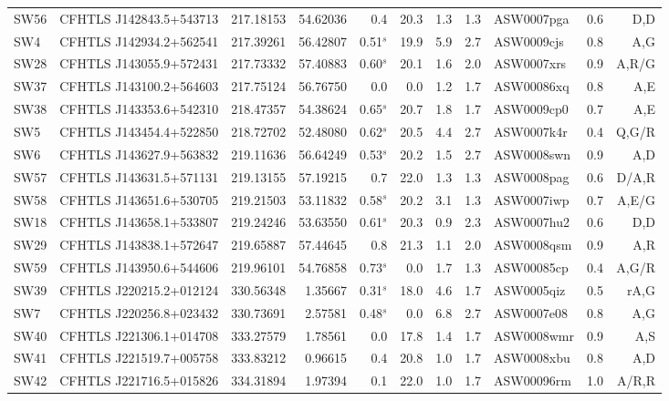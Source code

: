 \documentclass[useAMS,usenatbib,a4paper]{mn2e}
\begin{document}
\begin{center}
\begin{longtable}{llrrrrrrlrr}
SW56 & CFHTLS J142843.5+543713 & 217.18153 &  54.62036 &  0.4 & 20.3 &  1.3 &  1.3 & ASW0007pga &  0.6 &  D,D   \\
SW4 & CFHTLS J142934.2+562541 & 217.39261 &  56.42807 &  0.51$^s$ & 19.9 &  5.9 &  2.7 & ASW0009cjs &  0.8 &  A,G   \\
SW28 & CFHTLS J143055.9+572431 & 217.73332 &  57.40883 &  0.60$^s$ & 20.1 &  1.6 &  2.0 & ASW0007xrs &  0.9 &  A,R/G   \\
SW37 & CFHTLS J143100.2+564603 & 217.75124 &  56.76750 &  0.0 &  0.0 &  1.2 &  1.7 & ASW00086xq &  0.8 &  A,E   \\
SW38 & CFHTLS J143353.6+542310 & 218.47357 &  54.38624 &  0.65$^s$ & 20.7 &  1.8 &  1.7 & ASW0009cp0 &  0.7 &  A,E   \\
SW5 & CFHTLS J143454.4+522850 & 218.72702 &  52.48080 &  0.62$^s$ & 20.5 &  4.4 &  2.7 & ASW0007k4r &  0.4 &  Q,G/R   \\
SW6 & CFHTLS J143627.9+563832 & 219.11636 &  56.64249 &  0.53$^s$ & 20.2 &  1.5 &  2.7 & ASW0008swn &  0.9 &  A,D   \\
SW57 & CFHTLS J143631.5+571131 & 219.13155 &  57.19215 &  0.7 & 22.0 &  1.3 &  1.3 & ASW0008pag &  0.6 &  D/A,R   \\
SW58 & CFHTLS J143651.6+530705 & 219.21503 &  53.11832 &  0.58$^s$ & 20.2 &  3.1 &  1.3 & ASW0007iwp &  0.7 &  A,E/G   \\
SW18 & CFHTLS J143658.1+533807 & 219.24246 &  53.63550 &  0.61$^s$ & 20.3 &  0.9 &  2.3 & ASW0007hu2 &  0.6 &  D,D   \\
SW29 & CFHTLS J143838.1+572647 & 219.65887 &  57.44645 &  0.8 & 21.3 &  1.1 &  2.0 & ASW0008qsm &  0.9 &  A,R   \\
SW59 & CFHTLS J143950.6+544606 & 219.96101 &  54.76858 &  0.73$^s$ &  0.0 &  1.7 &  1.3 & ASW00085cp &  0.4 &  A,G/R   \\
SW39 & CFHTLS J220215.2+012124 & 330.56348 &   1.35667 &  0.31$^s$ & 18.0 &  4.6 &  1.7 & ASW0005qiz &  0.5 &  rA,G   \\
SW7 & CFHTLS J220256.8+023432 & 330.73691 &   2.57581 &  0.48$^s$ &  0.0 &  6.8 &  2.7 & ASW0007e08 &  0.8 &  A,G   \\
SW40 & CFHTLS J221306.1+014708 & 333.27579 &   1.78561 &  0.0 & 17.8 &  1.4 &  1.7 & ASW0008wmr &  0.9 &  A,S   \\
SW41 & CFHTLS J221519.7+005758 & 333.83212 &   0.96615 &  0.4 & 20.8 &  1.0 &  1.7 & ASW0008xbu &  0.8 &  A,D   \\
SW42 & CFHTLS J221716.5+015826 & 334.31894 &   1.97394 &  0.1 & 22.0 &  1.0 &  1.7 & ASW00096rm &  1.0 &  A/R,R   \\
\end{longtable}
\end{center}
\end{document}
